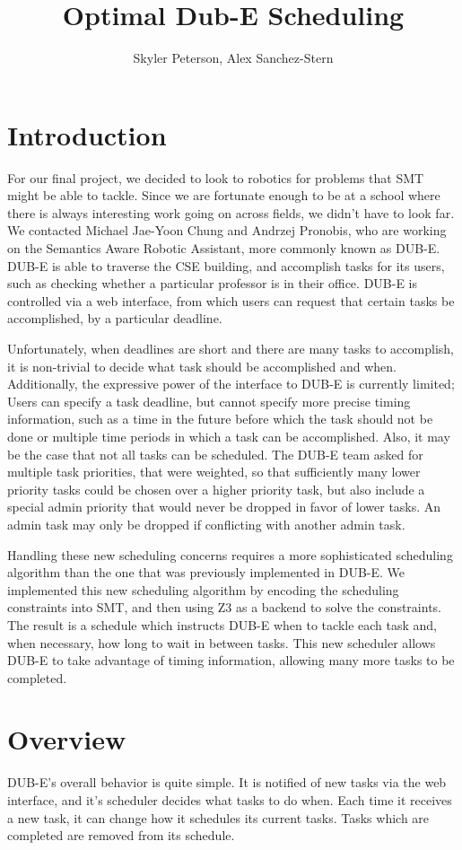 \documentclass[11pt]{article}
\title{Optimal Dub-E Scheduling}
\author{Skyler Peterson, Alex Sanchez-Stern}
\begin{document}
\maketitle
\section{Introduction}
For our final project,
we decided to look to robotics
for problems that SMT might be able to tackle.
Since we are fortunate enough to be at a school
where there is always interesting work going on across fields,
we didn't have to look far.
We contacted Michael Jae-Yoon Chung and Andrzej Pronobis,
who are working on the Semantics Aware Robotic Assistant,
more commonly known as DUB-E.
DUB-E is able to traverse the CSE building,
and accomplish tasks for its users,
such as checking whether a particular professor is in their office.
DUB-E is controlled via a web interface,
from which users can request that certain tasks be accomplished,
by a particular deadline.

Unfortunately, when deadlines are short
and there are many tasks to accomplish,
it is non-trivial to decide what task
should be accomplished and when.
Additionally, the expressive power of the interface to DUB-E
is currently limited;
Users can specify a task deadline,
but cannot specify more precise timing information,
such as a time in the future
before which the task should not be done
or multiple time periods in which a task can be accomplished.
Also, it may be the case that not all tasks can be scheduled.
The DUB-E team asked for multiple task priorities,
that were weighted,
so that sufficiently many lower priority tasks
could be chosen over a higher priority task,
but also include a special admin priority
that would never be dropped in favor of lower tasks.
An admin task may only be dropped if conflicting with another admin
task.

Handling these new scheduling concerns
requires a more sophisticated scheduling algorithm
than the one that was previously implemented in DUB-E.
We implemented this new scheduling algorithm
by encoding the scheduling constraints into SMT,
and then using Z3 as a backend
to solve the constraints.
The result is a schedule which instructs DUB-E
when to tackle each task and,
when necessary,
how long to wait in between tasks.
This new scheduler allows DUB-E
to take advantage of timing information,
allowing many more tasks to be completed.

\section{Overview}
DUB-E's overall behavior is quite simple.
It is notified of new tasks via the web interface,
and it's scheduler decides what tasks to do when.
Each time it receives a new task,
it can change how it schedules its current tasks.
Tasks which are completed are removed from its schedule.
\end{document}
